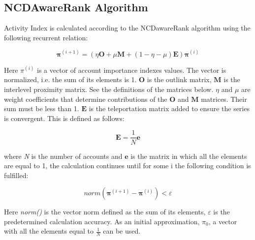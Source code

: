 \documentclass[a4paper,12pt]{article}
\begin{document}
\subsection{NCDAwareRank Algorithm}

Activity Index is calculated according to the NCDawareRank algorithm using the following recurrent relation: 


$$
\boldsymbol{\pi}^{(i+1)} = ( \eta \boldsymbol{O} + \mu \boldsymbol{M} + ( 1 - \eta - \mu ) \boldsymbol{E} ) \boldsymbol{\pi}^{(i)}
$$

Here $\pi^{(i)}$ is a vector of account importance indexes values. The vector is normalized, i.e. the sum of its elements is 1. $\boldsymbol{O}$ is the outlink matrix, $\boldsymbol{M}$ is the interlevel proximity matrix. See the definitions of the matrices below. $\eta$ and $\mu$ are weight coefficients that determine contributions of the $\boldsymbol{O}$ and $\boldsymbol{M}$ matrices. Their sum must be less than 1. $\boldsymbol{E}$ is the teleportation matrix added to ensure the series is convergent. This is defined as follows:


$$
\boldsymbol{E}=\frac{1}{N}\boldsymbol{e}
$$

where \textit{N} is the number of accounts and $\boldsymbol{e}$ is the matrix in which all the elements are equal to 1, the calculation continues until for some i the following condition is fulfilled: 


$$
norm(\boldsymbol{\pi}^{(i+1)}-\boldsymbol{\pi}^{(i)})<\varepsilon
$$

Here \textit{norm()} is the vector norm defined as the sum of its elements, $\varepsilon$ is the predetermined calculation accuracy. As an initial approximation, $\pi_0$, a vector with all the elements equal to $\frac{1}{N}$ can be used.
\end{document}
